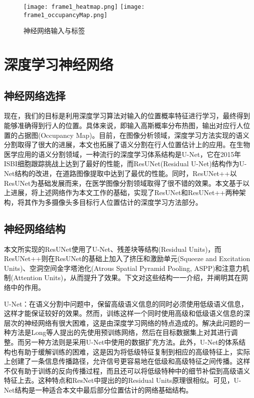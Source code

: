 \begin{figure}
    \centering
      {\texttt{[image: frame1\_heatmap.png]}}
      \quad
      {\texttt{[image: frame1\_occupancyMap.png]}}
    \caption{神经网络输入与标签}
    \label{inputs_outputs}
\end{figure}



\section{深度学习神经网络}

\subsection{神经网络选择}

现在，我们的目标是利用深度学习算法对输入的位置概率特征进行学习，最终得到能够准确得到行人的位置。具体来说，即输入高斯概率分布热图，输出对应行人位置的占据图(Occupancy Map)。目前，在图像分析领域，深度学习方法实现的语义分割取得了很大的进展\cite{2016V, 2015U, 2017Road}，本文也拓展了语义分割在行人位置估计上的应用。在生物医学应用的语义分割领域，一种流行的深度学习体系结构是U-Net\cite{2015U}，它在2015年ISBI细胞跟踪挑战上达到了最好的性能，而ResUNet(Residual U-Net)\cite{2017Road}结构作为U-Net结构的改进，在道路图像提取中达到了最优的性能。同时，ResUNet++\cite{2019ResUNet}以ResUNet为基础发展而来，在医学图像分割领域取得了很不错的效果。本文基于以上进展，将上述网络作为本文工作的基础，实现了ResUNet和ResUNet++两种架构，将其作为多摄像头多目标行人位置估计的深度学习方法部分。

\subsection{神经网络结构}

本文所实现的ResUNet使用了U-Net、残差块等结构(Residual Units)，而ResUNet++则在ResUNet的基础上加入了挤压和激励单元(Squeeze and Excitation Units)、空洞空间金字塔池化(Atrous Spatial Pyramid Pooling, ASPP)和注意力机制(Attention Units)，从而提升了效果。下文对这些结构一一介绍，并阐明其在网络中的作用。

U-Net：在语义分割中问题中，保留高级语义信息的同时必须使用低级语义信息，这样才能保证较好的效果。然而，训练这样一个同时使用高级和低级语义信息的深层次的神经网络有很大困难，这是由深度学习网络的特点造成的。解决此问题的一种方法是Long等人\cite{2015Fully}提出的先使用预训练网络，然后在目标数据集上对其进行调整。而另一种方法则是采用U-Net\cite{2015U}中使用的数据扩充方法。此外，U-Net的体系结构也有助于缓解训练的困难，这是因为将低级特征复制到相应的高级特征上，实际上创建了一条信息传播路径，允许信号更容易地在低级和高级特征之间传播。这样不仅有助于训练的反向传播过程，而且还可以将低级特种中的细节补偿到高级语义特征上去。这种特点和ResNet\cite{he2016deep}中提出的的Residual Units原理很相似。可见，U-Net结构是一种适合本文中最后部分位置估计的网络基础结构。


